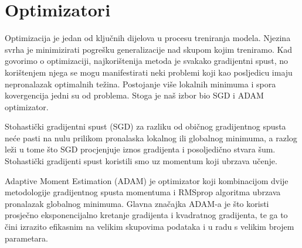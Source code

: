 \section{Optimizatori}

Optimizacija je jedan od ključnih dijelova u procesu treniranja modela. Njezina svrha je minimizirati pogrešku generalizacije nad skupom kojim treniramo.
Kad govorimo o optimizaciji, najkorištenija metoda je svakako gradijentni spust, no korištenjem njega se mogu manifestirati neki problemi koji kao posljedicu imaju nepronalazak optimalnih težina. Postojanje više lokalnih minimuma i spora kovergencija jedni su od problema. Stoga je naš izbor bio SGD i ADAM optimizator. 

Stohastički gradijentni spust (SGD) za razliku od običnog gradijentnog spusta neće pasti na nulu prilikom pronalaska lokalnog ili globalnog minimuma, a razlog leži u tome što SGD procjenjuje iznos gradijenta i posoljedično stvara šum.
Stohastički gradijenti spust koristili smo uz momentum koji ubrzava učenje. 

Adaptive Moment Estimation (ADAM) je optimizator koji kombinacijom dvije metodologije gradijentnog spusta momentuma i RMSprop algoritma ubrzava pronalazak globalnog minimuma. Glavna značajka ADAM-a je što koristi prosječno eksponencijalno kretanje gradijenta i kvadratnog gradijenta, te ga to čini izrazito efikasnim na velikim skupovima podataka i
u radu s velikim brojem parametara. 